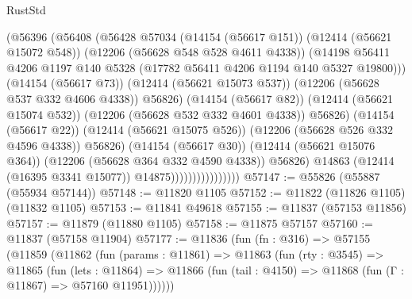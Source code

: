 \begin{lexlean}{RustStd}
\begin{coremodule}
{\begin{coremodule}
{{{{{{{{{{{{{{{{{{{{{{{{{{{{{{{{{{{{{{{{{{{{{{{{{{                                        (@56396
                                          (@56408
                                            (@56428
                                              @57034
                                              (@14154 (@56617 @151))
                                              (@12414 (@56621 @15072 @548))
                                              (@12206 (@56628 @548 @528 @4611 @4338))
                                              (@14198
                                                @56411
                                                @4206
                                                @1197
                                                @140
                                                @5328
                                                (@17782 @56411 @4206 @1194 @140 @5327 @19800)))
                                            (@14154 (@56617 @73))
                                            (@12414 (@56621 @15073 @537))
                                            (@12206 (@56628 @537 @332 @4606 @4338))
                                            @56826)
                                          (@14154 (@56617 @82))
                                          (@12414 (@56621 @15074 @532))
                                          (@12206 (@56628 @532 @332 @4601 @4338))
                                          @56826)
                                        (@14154 (@56617 @22))
                                        (@12414 (@56621 @15075 @526))
                                        (@12206 (@56628 @526 @332 @4596 @4338))
                                        @56826)
                                      (@14154 (@56617 @30))
                                      (@12414 (@56621 @15076 @364))
                                      (@12206 (@56628 @364 @332 @4590 @4338))
                                      @56826)
                                    @14863
                                    (@12414 (@16395 @3341 @15077))
                                    @14875))))))))))))))))
@57147 := @55826 (@55887 (@55934 @57144))
@57148 := @11820 @1105
@57152 := @11822 (@11826 @1105) (@11832 @1105)
@57153 := @11841 @49618
@57155 := @11837 (@57153 @11856)
@57157 := @11879 (@11880 @1105)
@57158 := @11875 @57157
@57160 := @11837 (@57158 @11904)
@57177 := @11836
    (fun (fn : @316) =>
    @57155
      (@11859
        (@11862
          (fun (params : @11861) =>
          @11863
            (fun (rty : @3545) =>
            @11865
              (fun (lets : @11864) =>
              @11866 (fun (tail : @4150) => @11868 (fun (Γ : @11867) => @57160 @11951))))))
}}}}}}}}}}}}}}}}}}}}}}}}}}}}}}}}}}}}}}}}}}}}}}}}}}
\end{coremodule}}
\end{coremodule}
\end{lexlean}
